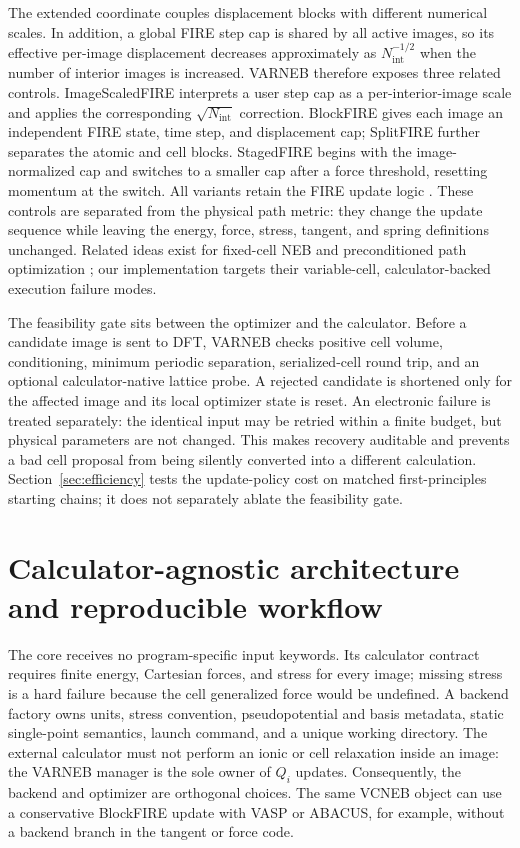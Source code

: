 \documentclass[final,5p,times,twocolumn]{elsarticle}
\begin{document}
The extended coordinate couples displacement blocks with different numerical
scales. In addition, a global FIRE step cap is shared by all active images, so
its effective per-image displacement decreases approximately as
$N_{\mathrm{int}}^{-1/2}$ when the number of interior images is increased.
VARNEB therefore exposes three related controls. ImageScaledFIRE interprets a
user step cap as a per-interior-image scale and applies the corresponding
$\sqrt{N_{\mathrm{int}}}$ correction. BlockFIRE gives each image an independent
FIRE state, time step, and displacement cap; SplitFIRE further separates the
atomic and cell blocks. StagedFIRE begins with the image-normalized cap and
switches to a smaller cap after a force threshold, resetting momentum at the
switch. All variants retain the FIRE update logic \cite{Bitzek2006}. These
controls are separated from the physical path metric: they
change the update sequence while leaving the energy, force, stress, tangent,
and spring definitions unchanged. Related ideas exist for fixed-cell NEB and
preconditioned path optimization \cite{Makri2019,Kolsbjerg2016,Lindgren2019};
our implementation targets their variable-cell, calculator-backed execution
failure modes.

The feasibility gate sits between the optimizer and the
calculator. Before a candidate image is sent to DFT, VARNEB checks positive
cell volume, conditioning, minimum periodic separation, serialized-cell round
trip, and an optional calculator-native lattice probe. A rejected candidate is
shortened only for the affected image and its local optimizer state is reset.
An electronic failure is treated separately: the identical input may be
retried within a finite budget, but physical parameters are not changed. This
makes recovery auditable and prevents a bad cell proposal from being silently
converted into a different calculation. Section~\ref{sec:efficiency} tests
the update-policy cost on matched first-principles starting chains; it does
not separately ablate the feasibility gate.

\section{Calculator-agnostic architecture and reproducible workflow}
\label{sec:software}

The core receives no program-specific input keywords. Its calculator contract
requires finite energy, Cartesian forces, and stress for every image; missing
stress is a hard failure because the cell generalized force would be undefined.
A backend factory owns units, stress convention, pseudopotential and basis
metadata, static single-point semantics, launch command, and a unique working
directory. The external calculator must not perform an ionic or cell
relaxation inside an image: the VARNEB manager is the sole owner of $Q_i$
updates. Consequently, the backend and optimizer are orthogonal choices. The
same VCNEB object can use a conservative BlockFIRE update with VASP or ABACUS,
for example, without a backend branch in the tangent or force code.
\end{document}
